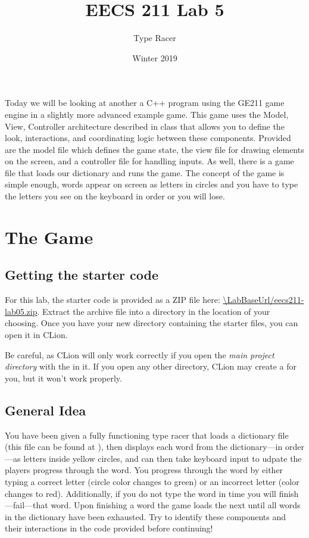 \documentclass{tufte-handout}
\title{EECS 211 Lab 5}
\author{Type Racer}
\date{Winter 2019}
\def\ThisLabBase{eecs211-lab05}
\def\ThisLabUrl{\LabBaseUrl/\ThisLabBase.zip}
\begin{document}
\maketitle

Today we will be looking at another a C++ program using the GE211 game engine
in a slightly more advanced example game. This game uses the Model, View,
Controller architecture described in class that allows you to define the look,
interactions, and coordinating logic between these components. Provided are
the model file which defines the game state, the view file for drawing elements
on the screen, and a controller file for handling inputs. As well, there is a
game file that loads our dictionary and runs the game. The concept of the game
is simple enough, words appear on screen as letters in circles and you have to
type the letters you see on the keyboard in order or you will lose.

\section{The Game}

\subsection{Getting the starter code}

For this lab, the starter code is provided as a ZIP file here:
\url{\ThisLabUrl}. Extract the archive file into a directory in the
location of your choosing. Once you have your new directory containing
the starter files, you can open it in CLion.

Be careful, as CLion will only work correctly if you open the \emph{main
project directory} with the  in it. If you open
any other directory, CLion may create a  for
you, but it won't work properly.

\subsection{General Idea}

You have been given a fully functioning type racer that loads a dictionary file
(this file can be found at ), then displays
each word from the dictionary---in order---as letters inside yellow circles, and
can then take keyboard input to udpate the players progress through the word. You
progress through the word by either typing a correct letter (circle color changes
to green) or an incorrect letter (color changes to red). Additionally, if you do
not type the word in time you will finish---fail---that word. Upon finishing a
word the game loads the next until all words in the dictionary have been exhausted.
Try to identify these components and their interactions in the code provided before
continuing!
\end{document}

